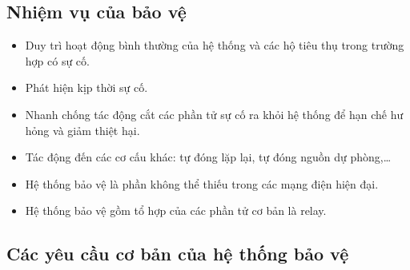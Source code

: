 \documentclass[12pt,a4paper]{article}
\begin{document}
\subsection{Nhiệm vụ của bảo vệ}
	\begin{itemize}
		\item Duy trì hoạt động bình thường của hệ thống và các hộ tiêu thụ trong trường hợp có sự cố.
		
		\item Phát hiện kịp thời sự cố.
		
		\item Nhanh chống tác động cắt các phần tử sự cố ra khỏi hệ thống để hạn chế hư hỏng và giảm thiệt hại.
		
		\item Tác động đến các cơ cấu khác: tự đóng lặp lại, tự đóng nguồn dự phòng,\ldots
		
		\item Hệ thống bảo vệ là phần không thể thiếu trong các mạng điện hiện đại.
		
		\item Hệ thống bảo vệ gồm tổ hợp của các phần tử cơ bản là relay.
	\end{itemize}
	
\subsection{Các yêu cầu cơ bản của hệ thống bảo vệ}
\end{document}
